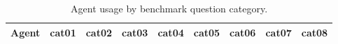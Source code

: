 \begin{table}
\caption{Agent usage by benchmark question category.}
\label{tab:agent-usage-by-category}
\begin{tabular}{lrrrrrrrr}
\hline
Agent & cat01 & cat02 & cat03 & cat04 & cat05 & cat06 & cat07 & cat08 \\
\hline
\hline
\end{tabular}
\end{table}
